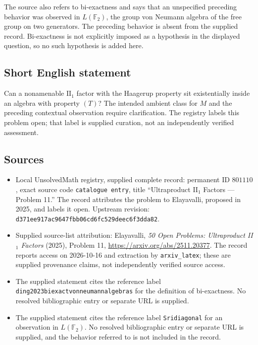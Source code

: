 \documentclass[11pt]{article}
\begin{document}
The source also refers to bi-exactness and says that an unspecified preceding behavior was observed in \(L(\mathbb F_2)\), the group von Neumann algebra of the free group on two generators. The preceding behavior is absent from the supplied record. Bi-exactness is not explicitly imposed as a hypothesis in the displayed question, so no such hypothesis is added here.
\subsection{Short English statement}
Can a nonamenable \(\mathrm{II}_1\) factor with the Haagerup property sit existentially inside an algebra with property \((T)\)? The intended ambient class for \(M\) and the preceding contextual observation require clarification. The registry labels this problem open; that label is supplied curation, not an independently verified assessment.
\subsection{Sources}
\begin{itemize}
\item Local UnsolvedMath registry, supplied complete record: permanent ID \(801110\), exact source code \texttt{catalogue entry}, title ``Ultraproduct II\(_1\) Factors --- Problem 11.'' The record attributes the problem to Elayavalli, proposed in 2025, and labels it open. Upstream revision: \texttt{d371ee917ac9647fbb06cd6fc529deec6f3dda82}.
\item Supplied source-list attribution: Elayavalli, \emph{50 Open Problems: Ultraproduct II\(_1\) Factors} (2025), Problem 11, \url{https://arxiv.org/abs/2511.20377}. The record reports access on 2026-10-16 and extraction by \texttt{arxiv\_latex}; these are supplied provenance claims, not independently verified source access.
\item The supplied statement cites the reference label \texttt{ding2023biexactvonneumannalgebras} for the definition of bi-exactness. No resolved bibliographic entry or separate URL is supplied.
\item The supplied statement cites the reference label \texttt{Sridiagonal} for an observation in \(L(\mathbb F_2)\). No resolved bibliographic entry or separate URL is supplied, and the behavior referred to is not included in the record.
\end{itemize}
\end{document}
